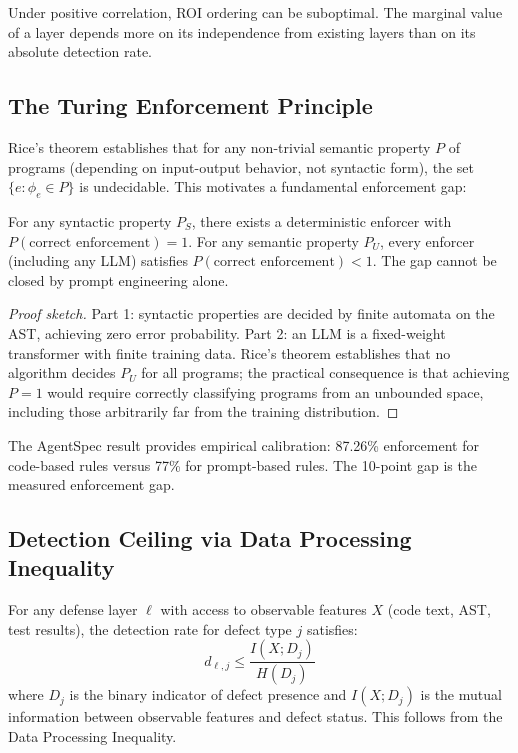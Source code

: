 Under positive correlation, ROI ordering can be suboptimal. The marginal value of a layer depends more on its independence from existing layers than on its absolute detection rate.

\subsection{The Turing Enforcement Principle}

Rice's theorem establishes that for any non-trivial semantic property $P$ of programs (depending on input-output behavior, not syntactic form), the set $\{e : \phi_e \in P\}$ is undecidable. This motivates a fundamental enforcement gap:

\begin{theorem}
\label{thm:enforcement-gap}
For any syntactic property $P_S$, there exists a deterministic enforcer with $P(\text{correct enforcement}) = 1$. For any semantic property $P_U$, every enforcer (including any LLM) satisfies $P(\text{correct enforcement}) < 1$. The gap cannot be closed by prompt engineering alone.
\end{theorem}

\begin{proof}[Proof sketch]
Part 1: syntactic properties are decided by finite automata on the AST, achieving zero error probability. Part 2: an LLM is a fixed-weight transformer with finite training data. Rice's theorem establishes that no algorithm decides $P_U$ for all programs; the practical consequence is that achieving $P = 1$ would require correctly classifying programs from an unbounded space, including those arbitrarily far from the training distribution.
\end{proof}

The AgentSpec result \citep{wang2026agentspec} provides empirical calibration: 87.26\% enforcement for code-based rules versus 77\% for prompt-based rules. The 10-point gap is the measured enforcement gap.

\subsection{Detection Ceiling via Data Processing Inequality}

\begin{theorem}
\label{thm:detection-ceiling}
For any defense layer $\ell$ with access to observable features $X$ (code text, AST, test results), the detection rate for defect type $j$ satisfies:
\begin{equation}
    d_{\ell,j} \leq \frac{I(X; D_j)}{H(D_j)}
\end{equation}
where $D_j$ is the binary indicator of defect presence and $I(X; D_j)$ is the mutual information between observable features and defect status. This follows from the Data Processing Inequality.
\end{theorem}

